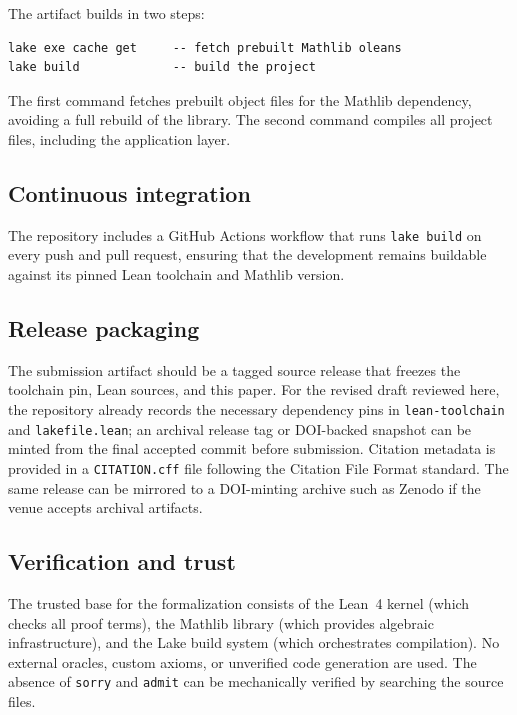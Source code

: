 \documentclass[11pt]{article}
\theoremstyle{plain}
\theoremstyle{definition}
\theoremstyle{remark}
\newcommand{\li}[1]{\texorpdfstring{\texttt{#1}}{#1}}
\newcommand{\lf}[1]{\texorpdfstring{\nolinkurl{#1}}{#1}}
\begin{document}
The artifact builds in two steps:
\begin{lstlisting}[style=lean]
lake exe cache get     -- fetch prebuilt Mathlib oleans
lake build             -- build the project
\end{lstlisting}
The first command fetches prebuilt object files for the Mathlib dependency,
avoiding a full rebuild of the library.  The second command compiles all
project files, including the application layer.

\subsection{Continuous integration}

The repository includes a GitHub Actions workflow that runs \li{lake build} on
every push and pull request, ensuring that the development remains buildable
against its pinned Lean toolchain and Mathlib version.

\subsection{Release packaging}

The submission artifact should be a tagged source release that freezes the
toolchain pin, Lean sources, and this paper.  For the revised draft reviewed
here, the repository already records the necessary dependency pins in
\lf{lean-toolchain} and \lf{lakefile.lean}; an archival release tag or
DOI-backed snapshot can be minted from the final accepted commit before
submission.  Citation metadata is provided in a \li{CITATION.cff} file
following the Citation File Format standard.  The same release can be mirrored
to a DOI-minting archive such as Zenodo if the venue accepts archival artifacts.

\subsection{Verification and trust}

The trusted base for the formalization consists of the Lean~4 kernel (which
checks all proof terms), the Mathlib library (which provides algebraic
infrastructure), and the Lake build system (which orchestrates compilation).
No external oracles, custom axioms, or unverified code generation are used.
The absence of \li{sorry} and \li{admit} can be mechanically verified by
searching the source files.


\end{document}
